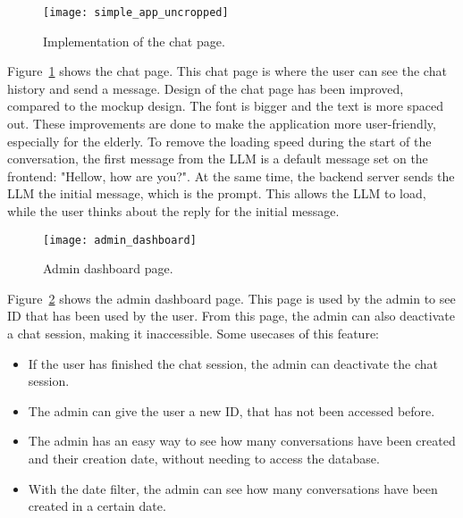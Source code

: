 \begin{figure}[h!]
    \centering
    \texttt{[image: simple\_app\_uncropped]}
    \caption{Implementation of the chat page.}\label{simple_app}
\end{figure}

Figure~\ref{simple_app} shows the chat page.
This chat page is where the user can see the chat history and send a message.
Design of the chat page has been improved, compared to the mockup design.
The font is bigger and the text is more spaced out.
These improvements are done to make the application more user-friendly, especially for the elderly.
To remove the loading speed during the start of the conversation, the first message from the \ac{LLM} is a default message set on the frontend: "Hellow, how are you?".
At the same time, the backend server sends the \ac{LLM} the initial message, which is the prompt.
This allows the \ac{LLM} to load, while the user thinks about the reply for the initial message.

\begin{figure}[h!]
    \centering
    \texttt{[image: admin\_dashboard]}
    \caption{Admin dashboard page.}\label{admin_dashboard}
\end{figure}

Figure~\ref{admin_dashboard} shows the admin dashboard page.
This page is used by the admin to see ID that has been used by the user.
From this page, the admin can also deactivate a chat session, making it inaccessible.
Some usecases of this feature:
\begin{itemize}
    \item If the user has finished the chat session, the admin can deactivate the chat session.
    \item The admin can give the user a new ID, that has not been accessed before.
    \item The admin has an easy way to see how many conversations have been created and their creation date, without needing to access the database.
    \item With the date filter, the admin can see how many conversations have been created in a certain date.
\end{itemize}